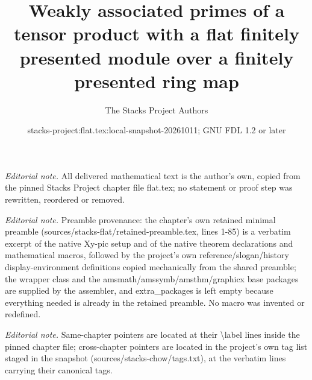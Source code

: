 \documentclass[10pt,a4paper]{amsart}
\title{Weakly associated primes of a tensor product with a flat finitely presented module over a finitely presented ring map}
\author{The Stacks Project Authors}
\date{stacks-project:flat.tex:local-snapshot-20261011; GNU FDL 1.2 or later}
\theoremstyle{plain}
\theoremstyle{definition}
\theoremstyle{remark}
\numberwithin{equation}{subsection}
\begin{document}
\maketitle
\noindent\textit{Editorial note.} All delivered mathematical text is the author's own, copied from the pinned Stacks Project chapter file flat.tex; no statement or proof step was rewritten, reordered or removed.\par\medskip
\noindent\textit{Editorial note.} Preamble provenance: the chapter's own retained minimal preamble (sources/stacks-flat/retained-preamble.tex, lines 1-85) is a verbatim excerpt of the native Xy-pic setup and of the native theorem declarations and mathematical macros, followed by the project's own reference/slogan/history display-environment definitions copied mechanically from the shared preamble; the wrapper class and the amsmath/amssymb/amsthm/graphicx base packages are supplied by the assembler, and extra\_packages is left empty because everything needed is already in the retained preamble. No macro was invented or redefined.\par\medskip
\noindent\textit{Editorial note.} Same-chapter pointers are located at their \textbackslash{}label lines inside the pinned chapter file; cross-chapter pointers are located in the project's own tag list staged in the snapshot (sources/stacks-chow/tags.txt), at the verbatim lines carrying their canonical tags.\par\medskip
\end{document}
